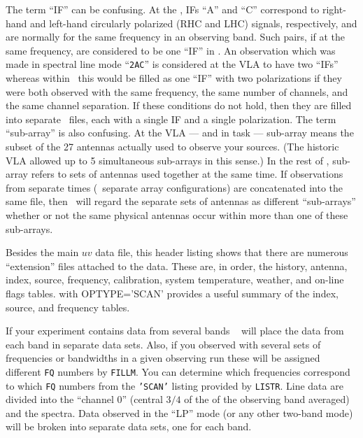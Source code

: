      The term ``IF'' can be confusing.  At the , IFs ``A''
and ``C'' correspond to right-hand and left-hand circularly polarized
(RHC and LHC) signals, respectively, and are normally for the same
frequency in an observing band.  Such pairs, if at the same frequency,
are considered to be one ``IF'' in \hbox{\AIPS}.   An observation
which was made in spectral line mode ``{\tt 2AC}'' is considered at
the VLA to have two ``IFs'' whereas within \AIPS\ this would be filled
as one ``IF'' with two polarizations if they were both observed with
the same frequency, the same number of channels, and the same channel
separation.  If these conditions do not hold, then they are filled
into separate \uv\ files, each with a single IF and a single
polarization.  The term ``sub-array'' is also confusing.  At the VLA
--- and in task {\tt {}} --- sub-array means the subset of
the 27 antennas actually used to observe your sources.  (The historic
VLA allowed up to 5 simultaneous sub-arrays in this sense.)  In the
rest of \AIPS, sub-array refers to sets of antennas used together at
the same time.  If observations from separate times (\eg\ separate
array configurations) are concatenated into the same file, then \AIPS\
will regard the separate sets of antennas as different ``sub-arrays''
whether or not the same physical antennas occur within more than one
of these sub-arrays.

     Besides the main $uv$ data file, this header listing shows that
there are numerous ``extension'' files attached to the data.  These
are, in order, the history, antenna, index, source, frequency,
calibration, system temperature, weather, and on-line flags tables.
{\tt \tndx{LISTR}} with {\us OPTYPE='SCAN'} provides a useful summary
of the index, source, and frequency tables.\iodx{extension files}

     If your experiment contains data from several bands {\tt
{}} will place the data from each band in separate data
sets.  Also, if you observed with several sets of frequencies or
bandwidths in a given observing run these will be assigned different
{\tt FQ} numbers by \hbox{{\tt FILLM}}.  You can determine which
frequencies correspond to which {\tt FQ} numbers from the {\tt 'SCAN'}
listing provided by \hbox{{\tt LISTR}}.  Line data are divided into
the ``channel 0'' (central $3/4$ of the of the observing band
averaged) and the spectra. Data observed in the ``LP'' mode (or any
other two-band mode) will be broken into separate data sets, one for
each band.


